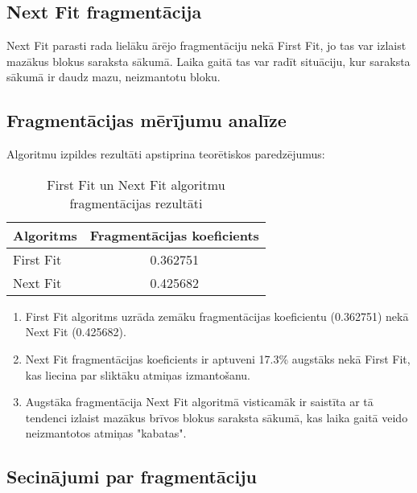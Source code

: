 \documentclass{report}
\begin{document}
	\subsection{Next Fit fragmentācija}
	
	Next Fit parasti rada lielāku ārējo fragmentāciju nekā First Fit, jo tas var izlaist mazākus blokus saraksta sākumā. Laika gaitā tas var radīt situāciju, kur saraksta sākumā ir daudz mazu, neizmantotu bloku.
	
	\subsection{Fragmentācijas mērījumu analīze}
	
	Algoritmu izpildes rezultāti apstiprina teorētiskos paredzējumus:
	
	\begin{table}[h]
		\centering
		\begin{tabular}{lc}
			\toprule
			\textbf{Algoritms} & \textbf{Fragmentācijas koeficients} \\
			\midrule
			First Fit & 0.362751 \\
			Next Fit & 0.425682 \\
			\bottomrule
		\end{tabular}
		\caption{First Fit un Next Fit algoritmu fragmentācijas rezultāti}
		\label{tab:fragmentation}
	\end{table}
	
	\begin{enumerate}
		\item First Fit algoritms uzrāda zemāku fragmentācijas koeficientu (0.362751) nekā Next Fit (0.425682).
		
		\item Next Fit fragmentācijas koeficients ir aptuveni 17.3\% augstāks nekā First Fit, kas liecina par sliktāku atmiņas izmantošanu.
		
		\item Augstāka fragmentācija Next Fit algoritmā visticamāk ir saistīta ar tā tendenci izlaist mazākus brīvos blokus saraksta sākumā, kas laika gaitā veido neizmantotos atmiņas "kabatas".
	\end{enumerate}
	
	\subsection{Secinājumi par fragmentāciju}
	
\end{document}
